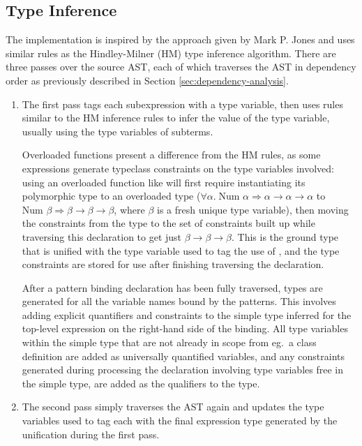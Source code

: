 \documentclass[dissertation.tex]{subfiles}
\begin{document}
{    \subsection{Type Inference}
    {
        The implementation is inspired by the approach given by Mark P. Jones\cite{THIH} and uses similar rules as the Hindley-Milner (HM) type inference algorithm. There are three passes over the source AST, each of which traverses the AST in dependency order as previously described in Section \ref{sec:dependency-analysis}.

        \begin{enumerate}
        \item
        {
            The first pass tags each subexpression with a type variable, then uses rules similar to the HM inference rules to infer the value of the type variable, usually using the type variables of subterms.
            
            Overloaded functions present a difference from the HM rules, as some expressions generate typeclass constraints on the type variables involved: using an overloaded function like \haskell{(+)} will first require instantiating its polymorphic type to an overloaded type (\(\forall\alpha.\;\text{Num }\alpha\Rightarrow\alpha\rightarrow\alpha\rightarrow\alpha\) to \(\text{Num }\beta\Rightarrow\beta\rightarrow\beta\rightarrow\beta\), where \(\beta\) is a fresh unique type variable), then moving the constraints from the type to the set of constraints built up while traversing this declaration to get just \(\beta\rightarrow\beta\rightarrow\beta\). This is the ground type that is unified with the type variable used to tag the use of \haskell{(+)}, and the type constraints are stored for use after finishing traversing the declaration.

            After a pattern binding declaration has been fully traversed, types are generated for all the variable names bound by the patterns. This involves adding explicit quantifiers and constraints to the simple type inferred for the top-level expression on the right-hand side of the binding. All type variables within the simple type that are not already in scope from eg.\ a class definition are added as universally quantified variables, and any constraints generated during processing the declaration involving type variables free in the simple type, are added as the qualifiers to the type.
        }
        \item
        {
            The second pass simply traverses the AST again and updates the type variables used to tag each with the final expression type generated by the unification during the first pass.
            
}
\end{enumerate}}}
\end{document}
